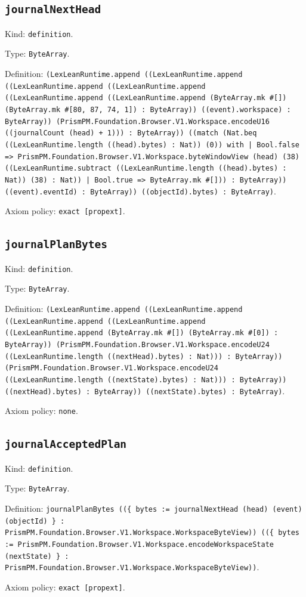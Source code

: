 \documentclass[11pt]{article}
\begin{document}
\subsection*{\texttt{journalNextHead}}
\noindent Kind: \texttt{definition}.\par
\noindent Type: \texttt{ByteArray}.\par
\noindent Definition: \texttt{(LexLeanRuntime.append ((LexLeanRuntime.append ((LexLeanRuntime.append ((LexLeanRuntime.append ((LexLeanRuntime.append ((LexLeanRuntime.append (ByteArray.mk \#[]) (ByteArray.mk \#[80, 87, 74, 1]) : ByteArray)) ((event).workspace) : ByteArray)) (PrismPM.Foundation.Browser.V1.Workspace.encodeU16 ((journalCount (head) + 1))) : ByteArray)) ((match (Nat.beq ((LexLeanRuntime.length ((head).bytes) : Nat)) (0)) with | Bool.false => PrismPM.Foundation.Browser.V1.Workspace.byteWindowView (head) (38) ((LexLeanRuntime.subtract ((LexLeanRuntime.length ((head).bytes) : Nat)) (38) : Nat)) | Bool.true => ByteArray.mk \#[])) : ByteArray)) ((event).eventId) : ByteArray)) ((objectId).bytes) : ByteArray)}.\par
\noindent Axiom policy: \texttt{exact [propext]}.\par
\subsection*{\texttt{journalPlanBytes}}
\noindent Kind: \texttt{definition}.\par
\noindent Type: \texttt{ByteArray}.\par
\noindent Definition: \texttt{(LexLeanRuntime.append ((LexLeanRuntime.append ((LexLeanRuntime.append ((LexLeanRuntime.append ((LexLeanRuntime.append (ByteArray.mk \#[]) (ByteArray.mk \#[0]) : ByteArray)) (PrismPM.Foundation.Browser.V1.Workspace.encodeU24 ((LexLeanRuntime.length ((nextHead).bytes) : Nat))) : ByteArray)) (PrismPM.Foundation.Browser.V1.Workspace.encodeU24 ((LexLeanRuntime.length ((nextState).bytes) : Nat))) : ByteArray)) ((nextHead).bytes) : ByteArray)) ((nextState).bytes) : ByteArray)}.\par
\noindent Axiom policy: \texttt{none}.\par
\subsection*{\texttt{journalAcceptedPlan}}
\noindent Kind: \texttt{definition}.\par
\noindent Type: \texttt{ByteArray}.\par
\noindent Definition: \texttt{journalPlanBytes ((\{ bytes := journalNextHead (head) (event) (objectId) \} : PrismPM.Foundation.Browser.V1.Workspace.WorkspaceByteView)) ((\{ bytes := PrismPM.Foundation.Browser.V1.Workspace.encodeWorkspaceState (nextState) \} : PrismPM.Foundation.Browser.V1.Workspace.WorkspaceByteView))}.\par
\noindent Axiom policy: \texttt{exact [propext]}.\par
\end{document}
